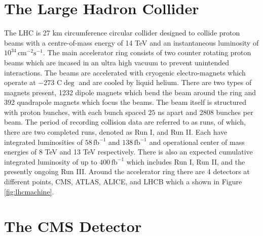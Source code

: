 \section{The Large Hadron Collider}
The LHC is 27 km circumference circular collider designed to collide proton beams with a centre-of-mass energy of 14 TeV and an instantaneous luminosity of $10^{34} \, \text{cm}^{-2}\text{s}^{-1}$\cite{Evans:2008zzb}. The main accelerator ring consists of two counter rotating proton beams which are incased in an ultra high vacuum to prevent unintended interactions. The beams are accelerated with cryogenic electro-magnets which operate at $-273$ C$\deg$ and are cooled by liquid helium. There are two types of magnets present, 1232 dipole magnets which bend the beam around the ring and 392 quadrapole magnets which focus the beams.  The beam itself is structured with proton bunches, with each bunch spaced $25$ ns apart and 2808 bunches per beam. The period of recording collision data are referred to as runs, of which, there are two completed runs, denoted as Run I, and Run II. Each have integrated luminosities of $58 \, \text{fb}^{-1}$ and $138\, \text{fb}^{-1}$ and operational center of mass energies of 8 TeV and 13 TeV respectively. There is also an expected cumulative integrated luminosity of up to $400 \,\text{fb}^{-1}$ which includes Run I, Run II, and the presently ongoing Run III. Around the accelerator ring there are 4 detectors at different points, CMS, ATLAS, ALICE, and LHCB which a shown in Figure \ref{fig:lhcmachine}.




\section{The CMS Detector}

